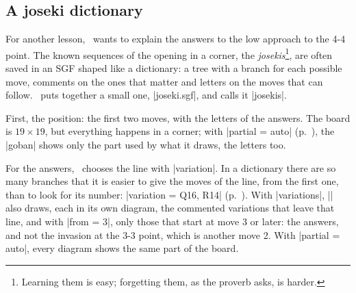 \begin{goban}
\begin{center}
\end{center}

\subsection{A joseki dictionary}
\label{tut:josekis}

For another lesson, \karu\ wants to explain the answers to the low approach to the 4-4 point. The known sequences of the opening in a corner, the \emph{josekis}\footnote{Learning them is easy; forgetting them, as the proverb asks, is harder.}, are often saved in an SGF shaped like a dictionary: a tree with a branch for each possible move, comments on the ones that matter and letters on the moves that can follow. \karu\ puts together a small one, |joseki.sgf|, and calls it |josekis|.

\begin{codeexample}
\end{codeexample}

First, the position: the first two moves, with the letters of the answers. The board is $19\times19$, but everything happens in a corner; with |partial = auto| (p.~\pageref{tut:parcial}), the |goban| shows only the part used by what it draws, the letters too.

\begin{codeexample}[]
	\begin{goban}[sgf size = josekis, partial = auto]
	\end{goban}
\end{codeexample}

For the answers, \karu\ chooses the line with |variation|. In a dictionary there are so many branches that it is easier to give the moves of the line, from the first one, than to look for its number: |variation = {Q16, R14}| (p.~\pageref{subsec:sgf}). With |variations|, |\sgfdiagrams| also draws, each in its own diagram, the commented variations that leave that line, and with |from = 3|, only those that start at move 3 or later: the answers, and not the invasion at the 3-3 point, which is another move 2. With |partial = auto|, every diagram shows the same part of the board.

\begin{codeexample}
\end{codeexample}


\end{goban}
